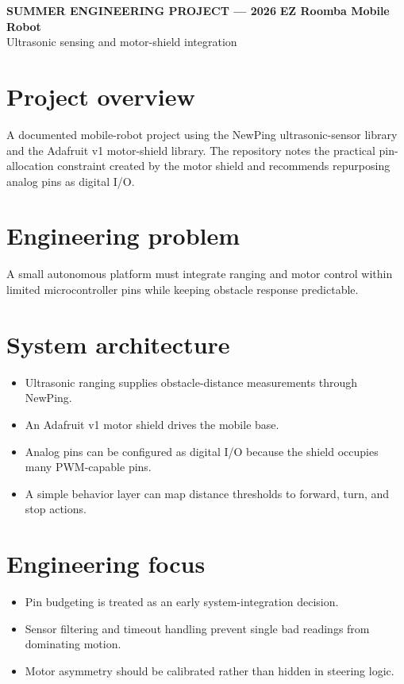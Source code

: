 \documentclass[10pt]{article}
\begin{document}
{\color{blue}\small\bfseries SUMMER ENGINEERING PROJECT --- 2026}
\vspace{0.4em}
{\color{navy}\LARGE\bfseries EZ Roomba Mobile Robot}\\
{\color{muted}\large Ultrasonic sensing and motor-shield integration}

\section*{Project overview}
A documented mobile-robot project using the NewPing ultrasonic-sensor library and the Adafruit v1 motor-shield library. The repository notes the practical pin-allocation constraint created by the motor shield and recommends repurposing analog pins as digital I/O.

\section*{Engineering problem}
A small autonomous platform must integrate ranging and motor control within limited microcontroller pins while keeping obstacle response predictable.

\section*{System architecture}
\begin{itemize}
\item Ultrasonic ranging supplies obstacle-distance measurements through NewPing.
\item An Adafruit v1 motor shield drives the mobile base.
\item Analog pins can be configured as digital I/O because the shield occupies many PWM-capable pins.
\item A simple behavior layer can map distance thresholds to forward, turn, and stop actions.
\end{itemize}

\section*{Engineering focus}
\begin{itemize}
\item Pin budgeting is treated as an early system-integration decision.
\item Sensor filtering and timeout handling prevent single bad readings from dominating motion.
\item Motor asymmetry should be calibrated rather than hidden in steering logic.
\end{itemize}
\end{document}
